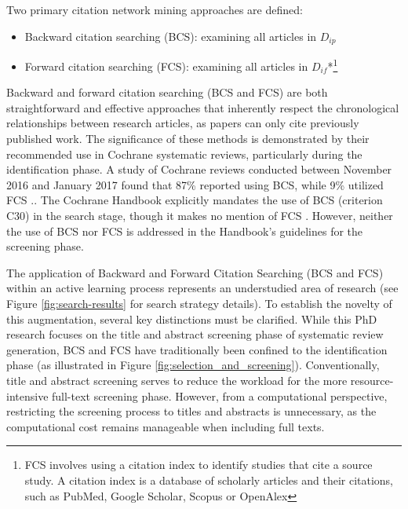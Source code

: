 \documentclass[../main.tex]{subfiles}
\begin{document}
Two primary citation network mining approaches are defined:
\begin{itemize}
    \item Backward citation searching (BCS): examining all articles in $D_{ip}$\cite{lefebvre2011cochrane, akers2009systematic}
    \item Forward citation searching (FCS): examining all articles in $D_{if}$*\footnote{FCS involves using a citation index to identify studies that cite a source study. A citation index is a database of scholarly articles and their citations, such as PubMed, Google Scholar, Scopus or OpenAlex}
\end{itemize}

Backward and forward citation searching (BCS and FCS) are both straightforward and effective approaches that inherently respect the chronological relationships between research articles, as papers can only cite previously published work. The significance of these methods is demonstrated by their recommended use in Cochrane systematic reviews, particularly during the identification phase. A study of Cochrane reviews conducted between November 2016 and January 2017 found that 87\% reported using BCS, while 9\% utilized FCS \cite{briscoeConductReportingCitation2019}.. The Cochrane Handbook explicitly mandates the use of BCS (criterion C30) in the search stage, though it makes no mention of FCS  \cite{MECIRManualCochrane}. However, neither the use of BCS nor FCS is addressed in the Handbook's guidelines for the screening phase.


The application of Backward and Forward Citation Searching (BCS and FCS) within an active learning process represents an understudied area of research (see Figure \ref{fig:search-results} for search strategy details). To establish the novelty of this augmentation, several key distinctions must be clarified. While this PhD research focuses on the title and abstract screening phase of systematic review generation, BCS and FCS have traditionally been confined to the identification phase (as illustrated in Figure \ref{fig:selection_and_screening}). Conventionally, title and abstract screening serves to reduce the workload for the more resource-intensive full-text screening phase. However, from a computational perspective, restricting the screening process to titles and abstracts is unnecessary, as the computational cost remains manageable when including full texts.
 
\end{document}
